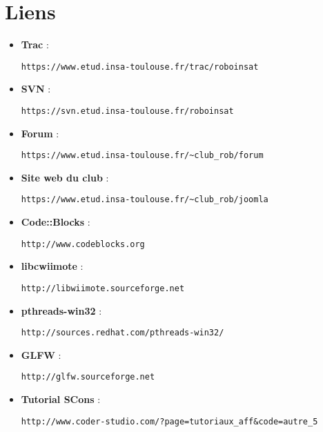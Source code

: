 
\section{Liens}
\begin{itemize}
\item \textbf{Trac} : \begin{verbatim}https://www.etud.insa-toulouse.fr/trac/roboinsat\end{verbatim}
\item \textbf{SVN} : \begin{verbatim}https://svn.etud.insa-toulouse.fr/roboinsat\end{verbatim}
\item \textbf{Forum} : \begin{verbatim}https://www.etud.insa-toulouse.fr/~club_rob/forum\end{verbatim}
\item \textbf{Site web du club} : \begin{verbatim}https://www.etud.insa-toulouse.fr/~club_rob/joomla\end{verbatim}
\item \textbf{Code::Blocks} : \begin{verbatim}http://www.codeblocks.org\end{verbatim}
\item \textbf{libcwiimote} : \begin{verbatim}http://libwiimote.sourceforge.net\end{verbatim}
\item \textbf{pthreads-win32} : \begin{verbatim}http://sources.redhat.com/pthreads-win32/\end{verbatim}
\item \textbf{GLFW} : \begin{verbatim}http://glfw.sourceforge.net\end{verbatim}
\item \textbf{Tutorial SCons} : \begin{verbatim}http://www.coder-studio.com/?page=tutoriaux_aff&code=autre_5\end{verbatim}
\end{itemize}
